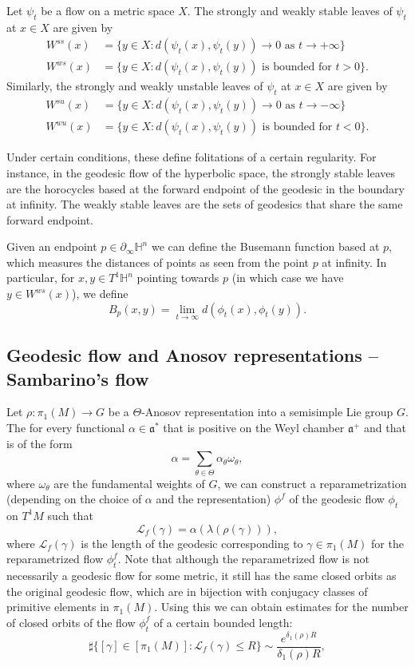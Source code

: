 \documentclass{report}
\begin{document}
\begin{definition}
    Let $\psi_t$ be a flow on a metric space $X$.
    The strongly and weakly stable leaves of $\psi_t$ at $x \in X$ are given by
    \begin{align*}
        W^{ss}(x) &= \{y \in X: d(\psi_t(x), \psi_t(y)) \to 0 \text{ as } t \to +\infty\}\\
        W^{ws}(x) &= \{y \in X: d(\psi_t(x), \psi_t(y)) \text{ is bounded for } t > 0\}.
    \end{align*}
    Similarly, the strongly and weakly unstable leaves of $\psi_t$ at $x \in X$ are given by
    \begin{align*}
        W^{su}(x) &= \{y \in X: d(\psi_t(x), \psi_t(y)) \to 0 \text{ as } t \to -\infty\}\\
        W^{wu}(x) &= \{y \in X: d(\psi_t(x), \psi_t(y)) \text{ is bounded for } t < 0\}.
    \end{align*}
\end{definition}
Under certain conditions, these define folitations of a certain regularity.
For instance, in the geodesic flow of the hyperbolic space, the strongly stable leaves are the horocycles based at the forward endpoint of the geodesic in the boundary at infinity.
The weakly stable leaves are the sets of geodesics that share the same forward endpoint.

Given an endpoint $p \in \partial_\infty \mathbb H^n$ we can define the Busemann function based at $p$, which measures the distances of points as seen from the point $p$ at infinity.
In particular, for $x,y \in T^1 \mathbb H^n$ pointing towards $p$ (in which case we have $y \in W^{ws}(x)$), we define
\[
B_p(x,y) = \lim_{t \to \infty} d(\phi_t(x), \phi_t(y)).
\]

\subsection{Geodesic flow and Anosov representations -- Sambarino's flow}
Let $\rho: \pi_1(M) \to G$ be a $\Theta$-Anosov representation into a semisimple Lie group $G$.
The for every functional $\alpha \in \mathfrak a^*$ that is positive on the Weyl chamber $\mathfrak a^+$ and that is of the form
\[
\alpha = \sum_{\theta \in \Theta} \alpha_\theta \omega_\theta,
\]
where $\omega_\theta$ are the fundamental weights of $G$, we can construct a reparametrization (depending on the choice of $\alpha$ and the representation) $\phi^f$ of the geodesic flow $\phi_t$ on $T^1 M$ such that 
\[
\mathcal L_f(\gamma) = \alpha(\lambda(\rho(\gamma))),
\]
where $\mathcal L_f(\gamma)$ is the length of the geodesic corresponding to $\gamma \in \pi_1(M)$ for the reparametrized flow $\phi^f_t$.
Note that although the reparametrized flow is not necessarily a geodesic flow for some metric, it still has the same closed orbits as the original geodesic flow, which are in bijection with conjugacy classes of primitive elements in $\pi_1(M)$.
Using this we can obtain estimates for the number of closed orbits of the flow $\phi^f_t$ of a certain bounded length:
\[
\sharp\{[\gamma] \in [\pi_1(M)]: \mathcal L_f(\gamma) \leq R\} \sim \frac{e^{\delta_1(\rho)R}}{\delta_1(\rho) R},
\]
\end{document}
